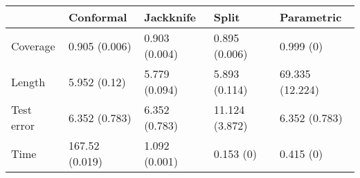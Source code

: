 \begin{tabular}{|l|l|l|l|l|}
\hline
& Conformal & Jackknife & Split & Parametric \\
\hline
Coverage & 0.905 (0.006) & 0.903 (0.004) & 0.895 (0.006) & 0.999 (0) \\
\hline
Length & 5.952 (0.12) & 5.779 (0.094) & 5.893 (0.114) & 69.335 (12.224) \\
\hline
Test error & 6.352 (0.783) & 6.352 (0.783) & 11.124 (3.872) & 6.352 (0.783) \\
\hline
Time & 167.52 (0.019) & 1.092 (0.001) & 0.153 (0) & 0.415 (0) \\
\hline
\end{tabular}
